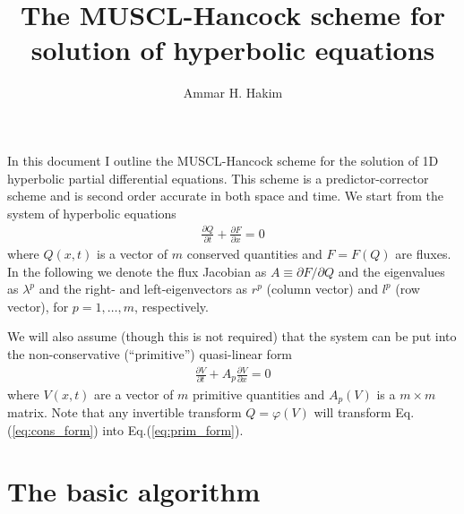 \documentclass[11pt, reqno]{amsart}
\title{The MUSCL-Hancock scheme for solution of hyperbolic equations}%
\author{Ammar H. Hakim}%
\date{}
\newcommand{\eqr}[1]{Eq.\thinspace(#1)}
\newcommand{\pfrac}[2]{\frac{\partial #1}{\partial #2}}
\newcommand{\pfracb}[2]{\partial #1/\partial #2}
\theoremstyle{definition}
\begin{document}

\maketitle

In this document I outline the MUSCL-Hancock scheme for the solution
of 1D hyperbolic partial differential equations. This scheme is a
predictor-corrector scheme and is second order accurate in both space
and time. We start from the system of hyperbolic equations
\begin{align}
  \pfrac{Q}{t} + \pfrac{F}{x} = 0 \label{eq:cons_form}
\end{align}
where $Q(x,t)$ is a vector of $m$ conserved quantities and $F=F(Q)$
are fluxes. In the following we denote the flux Jacobian as
$A\equiv\pfracb{F}{Q}$ and the eigenvalues as $\lambda^p$ and the
right- and left-eigenvectors as $r^p$ (column vector) and $l^p$ (row
vector), for $p=1,\ldots,m$, respectively.

We will also assume (though this is not required) that the system can
be put into the non-conservative (``primitive'') quasi-linear form
\begin{align}
  \pfrac{V}{t} + A_p\pfrac{V}{x} = 0 \label{eq:prim_form}
\end{align}
where $V(x,t)$ are a vector of $m$ primitive quantities and $A_p(V)$
is a $m\times m$ matrix. Note that any invertible transform
$Q=\varphi(V)$ will transform \eqr{\ref{eq:cons_form}} into
\eqr{\ref{eq:prim_form}}.

\section{The basic algorithm}
\end{document}
